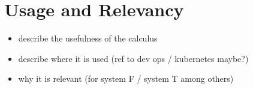 \section{Usage and Relevancy}

\begin{itemize}
    \item describe the usefulness of the calculus
    \item describe where it is used (ref to dev ops / kubernetes maybe?)
    \item why it is relevant (for system F / system T among others)
\end{itemize}
